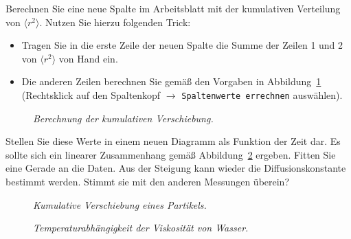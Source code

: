 \documentclass{../papanleitung}
\begin{document}
\begin{enumerate}
    Berechnen Sie eine neue Spalte im Arbeitsblatt mit der kumulativen Verteilung von $\langle r^2 \rangle$.
 Nutzen Sie hierzu folgenden Trick:
  \begin{itemize}
    \item 	Tragen Sie in die erste Zeile der neuen Spalte die Summe der Zeilen 1 und 2 von  $\langle r^2 \rangle$ von Hand ein.
    \item  Die anderen Zeilen berechnen Sie gem\"{a}{\ss} den Vorgaben in Abbildung~\ref{223_auswertung2} (Rechtsklick auf den Spaltenkopf $\rightarrow$ \verb"Spaltenwerte errechnen" ausw\"{a}hlen).
  \end{itemize}


 \begin{figure}
\begin{minipage}[c]{12cm}
\centering{}
\centering\caption{\label{223_auswertung2}\fontsize{10}{12}\it
Berechnung der kumulativen Verschiebung.}
\end{minipage}
\end{figure}

Stellen Sie diese Werte in einem neuen Diagramm als Funktion der Zeit dar. Es sollte sich ein linearer Zusammenhang gem\"{a}{\ss} Abbildung~\ref{223_auswertung3} ergeben. Fitten Sie eine Gerade an die Daten. Aus der Steigung kann wieder die Diffusionskonstante bestimmt werden. Stimmt sie mit den anderen Messungen \"{u}berein?

 \begin{figure}
\begin{minipage}[c]{12cm}
\centering{}
\centering\caption{\label{223_auswertung3}\fontsize{10}{12}\it
Kumulative Verschiebung eines Partikels.}
\end{minipage}
\end{figure}

\end{enumerate}




\begin{figure}
\begin{minipage}[c]{22cm}
\centering{}
\centering\caption{\label{249_Viskositaet}\fontsize{10}{12}\it
Temperaturabh\"{a}ngigkeit der Viskosit\"{a}t von Wasser.}
\end{minipage}
\end{figure}
\end{document}

